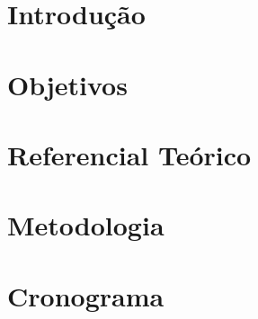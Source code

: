 \documentclass[12pt, a4paper, twoside]{article}
\numberwithin{equation}{subsection} %
\begin{document}
  
\newpage



\listoftables

\newpage

\listoffigures

\newpage

\tableofcontents

\newpage

\setcounter{page}{8}

\section{\textbf{Introdução}}


\newpage

\section{\textbf{Objetivos}}


\newpage
%

\newpage

\section{\textbf{Referencial Teórico}}


\newpage



\section{\textbf{Metodologia}}


\newpage

\section{\textbf{Cronograma}}

\end{document}
